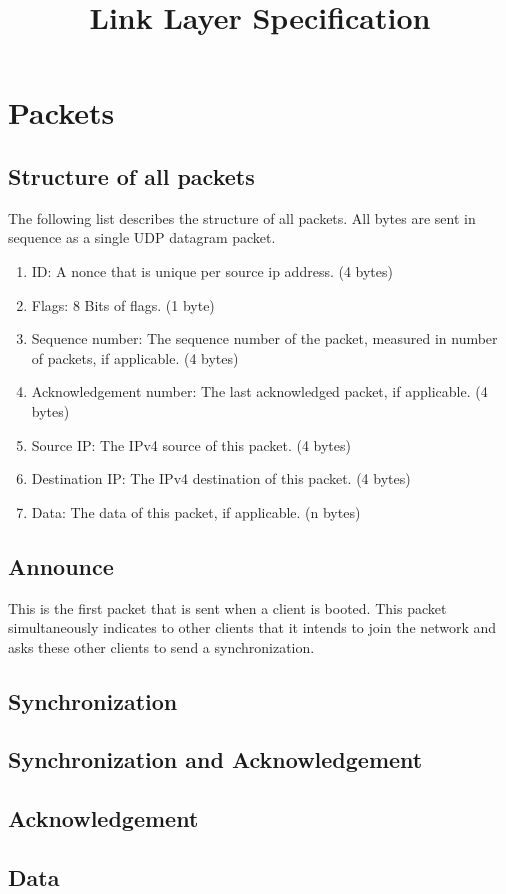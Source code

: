\documentclass{report}
\title{Link Layer Specification}
\begin{document}
    \maketitle

    \section{Packets}
    \subsection{Structure of all packets}
    The following list describes the structure of all packets. All bytes are sent in sequence as a single UDP datagram packet.

    \begin{enumerate}
        \item ID: A nonce that is unique per source ip address. (4 bytes)
        \item Flags: 8 Bits of flags. (1 byte)
        \item Sequence number: The sequence number of the packet, measured in number of packets, if applicable. (4 bytes)
        \item Acknowledgement number: The last acknowledged packet, if applicable. (4 bytes)
        \item Source IP: The IPv4 source of this packet. (4 bytes)
        \item Destination IP: The IPv4 destination of this packet. (4 bytes)
        \item Data: The data of this packet, if applicable. (n bytes)
    \end{enumerate}
    \subsection{Announce}
    This is the first packet that is sent when a client is booted. This packet simultaneously indicates to other clients that it intends to join the network and asks these other clients to send a synchronization.
    \subsection{Synchronization}
    \subsection{Synchronization and Acknowledgement}
    \subsection{Acknowledgement}
    \subsection{Data}
\end{document}
